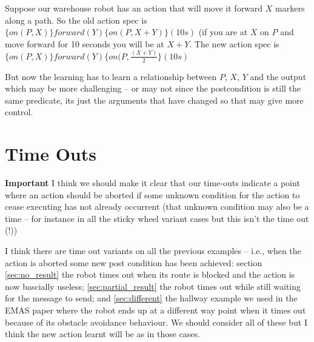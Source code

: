 \documentclass{blue-book}
\newcommand{\actionspec}[4]{\ensuremath{\{#1\}#2\{#3\}(#4)}}
\begin{document}
Suppose our warehouse robot has an action that will move it forward $X$ markers along a path.  So the old action spec is \actionspec{on(P, X)}{forward(Y)}{on(P, X+Y)}{10s} (if you are at $X$ on $P$ and move forward for 10 seconds you will be at $X+Y$.  The new action spec is \actionspec{on(P, X)}{forward(Y)}{on(P, \frac{(X+Y)}{2}}{10s}

But now the learning has to learn a relationship between $P$, $X$, $Y$ and the output which may be more challenging -- or may not since the postcondition is still the same predicate, its just the arguments that have changed so that may give more control.

\section{Time Outs}

{\bf Important} I think we should make it clear that our time-outs indicate a point where an action should be aborted if some unknown condition for the action to cease executing has not already occurrent (that unknown condition may also be a time -- for instance in all the sticky wheel variant cases but this isn't the time out (!))

I think there are time out variants on all the previous examples -- i.e., when the action is aborted some new post condition has been achieved: section \ref{sec:no_result} the robot times out when its route is blocked and the action is now bascially useless; \ref{sec:partial_result} the robot times out while still waiting for the message to send; and \ref{sec:different} the hallway example we used in the EMAS paper where the robot ends up at a different way point when it times out because of its obstacle avoidance behaviour.  We should consider all of these but I think the new action learnt will be as in those cases.
\end{document}
